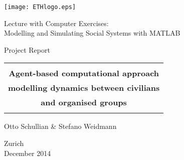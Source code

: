 
\thispagestyle{empty}

\begin{center}
\texttt{[image: ETHlogo.eps]}

\bigskip


\bigskip


\bigskip


\LARGE{ 	Lecture with Computer Exercises:\\ }
\LARGE{ Modelling and Simulating Social Systems with MATLAB\\}

\bigskip

\bigskip

\small{Project Report}\\

\bigskip

\bigskip

\bigskip

\bigskip


\begin{tabular}{|c|}
\hline
\\
\textbf{\LARGE{Agent-based computational approach }}\\
\textbf{\LARGE{modelling dynamics between civilians}}\\
\textbf{\LARGE{and organised groups}}\\
\\
\hline
\end{tabular}
\bigskip

\bigskip

\bigskip

\LARGE{Otto Schullian \& Stefano Weidmann}



\bigskip

\bigskip

\bigskip

\bigskip

\bigskip

\bigskip

\bigskip

\bigskip

Zurich\\
December 2014\\

\end{center}


